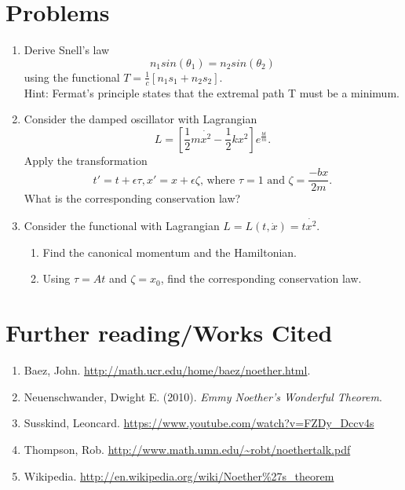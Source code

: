 \documentclass[11pt]{article}
\begin{document}
\section{Problems}
\begin{enumerate}

\item Derive Snell's law
$$n_1sin(\theta_1)=n_2sin(\theta_2)$$
 using the functional $T=\frac{1}{c}[n_1s_1+n_2s_2].$\\
Hint: Fermat's principle states that the extremal path T must be a minimum.

\item Consider the damped oscillator with Lagrangian
$$L=[\frac{1}{2}m\dot{x^2}-\frac{1}{2}kx^2]e^{\frac{bt}{m}}.$$
Apply the transformation
$$t'=t+\epsilon\tau, x'=x+\epsilon\zeta\textrm{, where }\tau=1\textrm{ and }\zeta=\frac{-bx}{2m}.$$
What is the corresponding conservation law?

\item Consider the functional with Lagrangian $L=L(t,\dot{x})=t\dot{x^2}.$
\begin{enumerate}
\item Find the canonical momentum and the Hamiltonian.
\item Using $\tau=At$ and $\zeta=x_0$, find the corresponding conservation law.
\end{enumerate}
\end{enumerate}

\section{Further reading/Works Cited}
\begin{enumerate}
\item Baez, John. \url{http://math.ucr.edu/home/baez/noether.html}.
\item Neuenschwander, Dwight E. (2010). \emph{Emmy Noether's Wonderful Theorem}.
\item Susskind, Leoncard. \url{https://www.youtube.com/watch?v=FZDy_Dccv4s}
\item Thompson, Rob. \url{http://www.math.umn.edu/~robt/noethertalk.pdf}
\item Wikipedia. \url{http://en.wikipedia.org/wiki/Noether%27s_theorem}
\end{enumerate}
\end{document}
